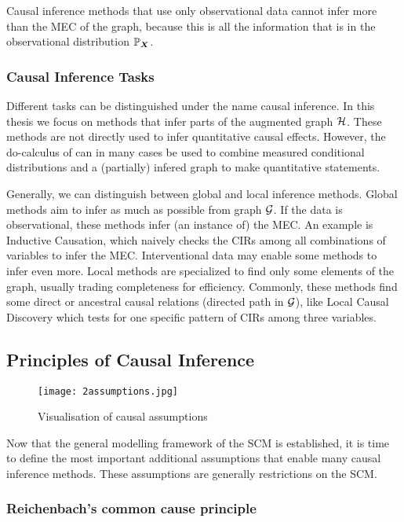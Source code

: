 Causal inference methods that use only observational data cannot infer more than the MEC of the graph, because this is all the information that is in the observational distribution $\mathbb{P}_{\bm{X}}$.


\subsubsection{Causal Inference Tasks}
Different tasks can be distinguished under the name causal inference. In this thesis we focus on methods that infer parts of the augmented graph $\mathcal{H}$. These methods are not directly used to infer quantitative causal effects. However, the do-calculus of \citet{pearl2009causality} can in many cases be used to combine measured conditional distributions and a (partially) infered graph to make quantitative statements.

Generally, we can distinguish between global and local inference methods. Global methods aim to infer as much as possible from graph $\mathcal{G}$. If the data is observational, these methods infer (an instance of) the MEC. An example is Inductive Causation, which naively checks the CIRs among all combinations of variables to infer the MEC. Interventional data may enable some methods to infer even more. Local methods are specialized to find only some elements of the graph, usually trading completeness for efficiency. Commonly, these methods find some direct or ancestral causal relations (directed path in $\mathcal{G}$), like Local Causal Discovery which tests for one specific pattern of CIRs among three variables.


\subsection{Principles of Causal Inference}
\label{sec:back:prin}

\begin{figure}[h]
    \centering
    \texttt{[image: 2assumptions.jpg]}
    \caption{Visualisation of causal assumptions}
    \label{fig:2:ass}
\end{figure}

Now that the general modelling framework of the SCM is established, it is time to define the most important additional assumptions that enable many causal inference methods. These assumptions are generally restrictions on the SCM.

\subsubsection{Reichenbach's common cause principle}

